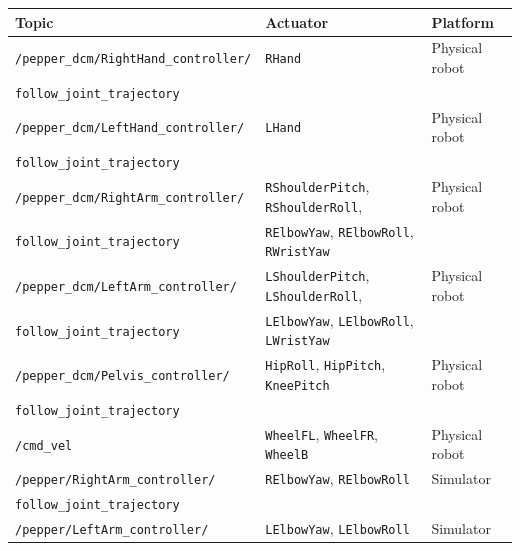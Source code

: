 \documentclass{CSSRforAfrica}
\begin{document}
\begin{center}
\begin{tabularx}{\linewidth}{| X | l| l|}
\hline 
{\small Topic }                                                                                & {\small Actuator }    &  {\small Platform}       \\
\hline
{\footnotesize \verb+/pepper_dcm/RightHand_controller/+ }  & {\footnotesize  \verb+RHand+} & {\small Physical robot } \\ 
{\footnotesize \verb+follow_joint_trajectory+ }                        &   & \\ 
\hline
{\footnotesize \verb+/pepper_dcm/LeftHand_controller/+ }  & {\footnotesize \verb+LHand+ } & {\small Physical robot } \\ 
{\footnotesize \verb+follow_joint_trajectory+ }  & & \\ 
\hline
{\footnotesize \verb+/pepper_dcm/RightArm_controller/+ }  & {\footnotesize \verb+RShoulderPitch+, \verb+RShoulderRoll+,   } & {\small Physical robot } \\ 
{\footnotesize \verb+follow_joint_trajectory+ }                                          & {\footnotesize \verb+RElbowYaw+, \verb+RElbowRoll+, \verb+RWristYaw+  } & \\
\hline
{\footnotesize \verb+/pepper_dcm/LeftArm_controller/+ }     & {\footnotesize  \verb+LShoulderPitch+, \verb+LShoulderRoll+,  } & {\small Physical robot } \\ 
{\footnotesize \verb+follow_joint_trajectory+ }                                        & {\footnotesize  \verb+LElbowYaw+, \verb+LElbowRoll+, \verb+LWristYaw+  } & \\ 
\hline
{\footnotesize \verb+/pepper_dcm/Pelvis_controller/+ }  & {\footnotesize \verb+HipRoll+, \verb+HipPitch+,  \verb+KneePitch+ } & {\small Physical robot } \\ 
{\footnotesize \verb+follow_joint_trajectory+ }                                   & {\footnotesize  } & \\ 
\hline
{\footnotesize \verb+/cmd_vel+ }  & {\footnotesize \verb+WheelFL+, \verb+WheelFR+, \verb+WheelB+ } & {\small Physical robot } \\ 
\hline
{\footnotesize \verb+/pepper/RightArm_controller/+ }  & {\footnotesize \verb+RElbowYaw+, \verb+RElbowRoll+ } & {\small  Simulator} \\ 
{\footnotesize \verb+follow_joint_trajectory+ }                        &   & \\ 
\hline
{\footnotesize \verb+/pepper/LeftArm_controller/+ }  & {\footnotesize  \verb+LElbowYaw+, \verb+LElbowRoll+ } & {\small  Simulator} \\ 

\end{tabularx}
\end{center}
\end{document}
